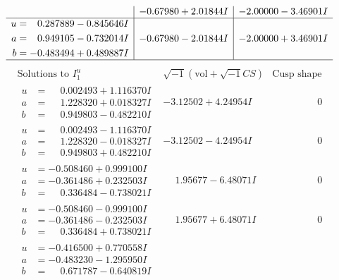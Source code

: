 \documentclass[1p]{elsarticle_modified}
\theoremstyle{definition}
\newcommand{\I}{\sqrt{-1}}
\begin{document}
$$\begin{array}{c|c|c}
 & -0.67980 + 2.01844 I & -2.00000 - 3.46901 I \\ \hline\begin{aligned}
u &= \phantom{-}0.287889 - 0.845646 I \\
a &= \phantom{-}0.949105 - 0.732014 I \\
b &= -0.483494 + 0.489887 I\end{aligned}
 & -0.67980 - 2.01844 I & -2.00000 + 3.46901 I\\
 \hline 
 \end{array}$$\newpage$$\begin{array}{c|c|c}  
\text{Solutions to }I^u_{1}& \I (\text{vol} + \sqrt{-1}CS) & \text{Cusp shape}\\
 \hline 
\begin{aligned}
u &= \phantom{-}0.002493 + 1.116370 I \\
a &= \phantom{-}1.228320 + 0.018327 I \\
b &= \phantom{-}0.949803 - 0.482210 I\end{aligned}
 & -3.12502 + 4.24954 I & \phantom{-0.000000 } 0 \\ \hline\begin{aligned}
u &= \phantom{-}0.002493 - 1.116370 I \\
a &= \phantom{-}1.228320 - 0.018327 I \\
b &= \phantom{-}0.949803 + 0.482210 I\end{aligned}
 & -3.12502 - 4.24954 I & \phantom{-0.000000 } 0 \\ \hline\begin{aligned}
u &= -0.508460 + 0.999100 I \\
a &= -0.361486 + 0.232503 I \\
b &= \phantom{-}0.336484 - 0.738021 I\end{aligned}
 & \phantom{-}1.95677 - 6.48071 I & \phantom{-0.000000 } 0 \\ \hline\begin{aligned}
u &= -0.508460 - 0.999100 I \\
a &= -0.361486 - 0.232503 I \\
b &= \phantom{-}0.336484 + 0.738021 I\end{aligned}
 & \phantom{-}1.95677 + 6.48071 I & \phantom{-0.000000 } 0 \\ \hline\begin{aligned}
u &= -0.416500 + 0.770558 I \\
a &= -0.483230 - 1.295950 I \\
b &= \phantom{-}0.671787 - 0.640819 I\end{aligned}

\end{array}$$
\end{document}
